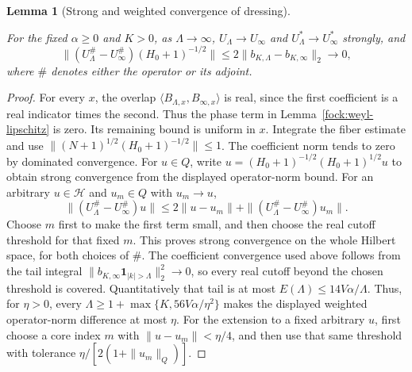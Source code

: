 \documentclass[11pt,a4paper]{article}
\newtheorem{lemma}[theorem]{Lemma}
\theoremstyle{definition}
\theoremstyle{remark}
\newcommand{\proofid}[1]{\par\smallskip{\normalfont\scriptsize\color{inkblue}Stable ID: \nolinkurl{#1}}\par\smallskip}
\begin{document}
\begin{lemma}[Strong and weighted convergence of dressing]
\label{main:gross-convergence}
\proofid{main:gross-convergence}
\par{}\par\smallskip

For the fixed $\alpha\geq0$ and $K>0$, as $\Lambda\to\infty$,
$U_\Lambda\to U_\infty$ and $U_\Lambda^*\to U_\infty^*$ strongly, and
\[
 \|(U_\Lambda^{\#}-U_\infty^{\#})(H_0+1)^{-1/2}\|
 \leq2\|b_{K,\Lambda}-b_{K,\infty}\|_2\longrightarrow0,
\]
where $\#$ denotes either the operator or its adjoint.
\end{lemma}
\begin{proof}
For every $x$, the overlap
$\langle B_{\Lambda,x},B_{\infty,x}\rangle$ is real, since the first
coefficient is a real indicator times the second. Thus the phase term
in Lemma~\ref{fock:weyl-lipschitz} is zero. Its remaining bound is
uniform in $x$. Integrate the fiber estimate and use
$\|(N+1)^{1/2}(H_0+1)^{-1/2}\|\leq1$.
The coefficient norm tends to zero by dominated convergence. For $u\in Q$, write $u=(H_0+1)^{-1/2}(H_0+1)^{1/2}u$
to obtain strong convergence from the displayed operator-norm bound.
For an arbitrary $u\in\mathcal H$ and $u_m\in Q$ with $u_m\to u$,
\[
 \|(U_\Lambda^\#-U_\infty^\#)u\|
 \leq2\|u-u_m\|+\|(U_\Lambda^\#-U_\infty^\#)u_m\|.
\]
Choose $m$ first to make the first term small, and then choose the
real cutoff threshold for that fixed $m$. This proves strong
convergence on the whole Hilbert space, for both choices of $\#$.
The coefficient convergence used above follows from the tail integral
$\|b_{K,\infty}\mathbf1_{|k|>\Lambda}\|_2^2\to0$, so every real
cutoff beyond the chosen threshold is covered. Quantitatively that
tail is at most $E(\Lambda)\leq14V\alpha/\Lambda$. Thus, for
$\eta>0$, every
$\Lambda\geq1+\max\{K,56V\alpha/\eta^2\}$ makes the
displayed weighted operator-norm difference at most $\eta$.
For the extension to a fixed arbitrary $u$, first choose a core
index $m$ with $\|u-u_m\|<\eta/4$, and then use that same
threshold with tolerance $\eta/[2(1+\|u_m\|_Q)]$.
\end{proof}
\end{document}
